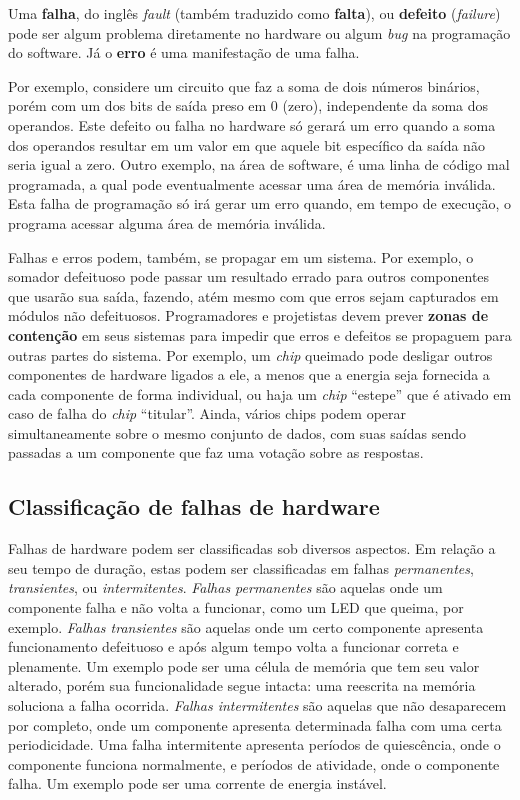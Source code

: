 Uma \textbf{falha}, do inglês \emph{fault} (também traduzido como \textbf{falta}), ou \textbf{defeito} (\emph{failure}) pode ser algum problema diretamente no hardware ou algum \emph{bug} na programação do software. Já o \textbf{erro} é uma manifestação de uma falha.

Por exemplo, considere um circuito que faz a soma de dois números binários, porém com um dos bits de saída preso em $0$ (zero), independente da soma dos operandos. Este defeito ou falha no hardware só gerará um erro quando a soma dos operandos resultar em um valor em que aquele bit específico da saída não seria igual a zero. Outro exemplo, na área de software, é uma linha de código mal programada, a qual pode eventualmente acessar uma área de memória inválida. Esta falha de programação só irá gerar um erro quando, em tempo de execução, o programa acessar alguma área de memória inválida.

Falhas e erros podem, também, se propagar em um sistema. Por exemplo, o somador defeituoso pode passar um resultado errado para outros componentes que usarão sua saída, fazendo, atém mesmo com que erros sejam capturados em módulos não defeituosos. Programadores e projetistas devem prever \textbf{zonas de contenção} em seus sistemas para impedir que erros e defeitos se propaguem para outras partes do sistema. Por exemplo, um \emph{chip} queimado pode desligar outros componentes de hardware ligados a ele, a menos que a energia seja fornecida a cada componente de forma individual, ou haja um \emph{chip} ``estepe'' que é ativado em caso de falha do \emph{chip} ``titular''. Ainda, vários chips podem operar simultaneamente sobre o mesmo conjunto de dados, com suas saídas sendo passadas a um componente que faz uma votação sobre as respostas.



\subsection{Classificação de falhas de hardware} %
\label{sub:classificacao}

Falhas de hardware podem ser classificadas sob diversos aspectos. Em relação a seu tempo de duração, estas podem ser classificadas em falhas \emph{permanentes}, \emph{transientes}, ou \emph{intermitentes}. \emph{Falhas permanentes} são aquelas onde um componente falha e não volta a funcionar, como um LED que queima, por exemplo. \emph{Falhas transientes} são aquelas onde um certo componente apresenta funcionamento defeituoso e após algum tempo volta a funcionar correta e plenamente. Um exemplo pode ser uma célula de memória que tem seu valor alterado, porém sua funcionalidade segue intacta: uma reescrita na memória soluciona a falha ocorrida. \emph{Falhas intermitentes} são aquelas que não desaparecem por completo, onde um componente apresenta determinada falha com uma certa periodicidade. Uma falha intermitente apresenta períodos de quiescência, onde o componente funciona normalmente, e períodos de atividade, onde o componente falha. Um exemplo pode ser uma corrente de energia instável.

